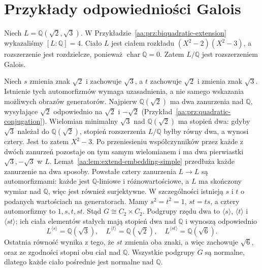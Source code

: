 \section{Przykłady odpowiedniości Galois}
\begin{przyklad}
\label{aa:prz:biquadratic-galois-lattice}
Niech $L=\mathbb Q(\sqrt2,\sqrt3)$. W
Przykładzie~\ref{aa:prz:biquadratic-extension} wykazaliśmy
$[L:\mathbb Q]=4$. Ciało $L$ jest ciałem rozkładu
$(X^2-2)(X^2-3)$, a rozszerzenie jest rozdzielcze,
ponieważ $\operatorname{char}\mathbb Q=0$.
Zatem $L/\mathbb Q$ jest rozszerzeniem Galois.

Niech $s$ zmienia znak $\sqrt2$ i zachowuje $\sqrt3$,
a $t$ zachowuje $\sqrt2$ i zmienia znak $\sqrt3$.
Istnienie tych automorfizmów wymaga uzasadnienia, a nie
samego wskazania możliwych obrazów generatorów.
Najpierw $\mathbb Q(\sqrt2)$ ma dwa zanurzenia nad
$\mathbb Q$, wysyłające $\sqrt2$ odpowiednio na
$\sqrt2$ i $-\sqrt2$ (Przykład~\ref{aa:prz:quadratic-conjugation}).
Wielomian minimalny $\sqrt3$ nad $\mathbb Q(\sqrt2)$
ma stopień dwa: gdyby $\sqrt3$ należał do
$\mathbb Q(\sqrt2)$, stopień rozszerzenia
$L/\mathbb Q$ byłby równy dwa, a wynosi cztery.
Jest to zatem $X^2-3$. Po przeniesieniu współczynników
przez każde z dwóch zanurzeń pozostaje on tym samym
wielomianem i ma dwa pierwiastki $\sqrt3,-\sqrt3$
w $L$. Lemat~\ref{aa:lem:extend-embedding-simple}
przedłuża każde zanurzenie na dwa sposoby. Powstałe
cztery zanurzenia $L\to L$ są automorfizmami:
każde jest $\mathbb Q$-liniowe i różnowartościowe,
a $L$ ma skończony wymiar nad $\mathbb Q$, więc
jest również surjektywne. W szczególności istnieją $s$ i $t$
o podanych wartościach na generatorach.
Mamy $s^2=t^2=1$, $st=ts$, a cztery automorfizmy to
$1,s,t,st$. Stąd
$G\cong C_2\times C_2$. Podgrupy rzędu dwa to
$\langle s\rangle$, $\langle t\rangle$ i
$\langle st\rangle$; ich ciała elementów stałych
mają stopień dwa nad $\mathbb Q$ i wynoszą odpowiednio
\[
L^{\langle s\rangle}=\mathbb Q(\sqrt3),\quad
L^{\langle t\rangle}=\mathbb Q(\sqrt2),\quad
L^{\langle st\rangle}=\mathbb Q(\sqrt6).
\]
Ostatnia równość wynika z tego, że $st$ zmienia
oba znaki, a więc zachowuje $\sqrt6$, oraz ze
zgodności stopni obu ciał nad $\mathbb Q$.
Wszystkie podgrupy $G$ są normalne, dlatego każde
ciało pośrednie jest normalne nad $\mathbb Q$.
\end{przyklad}

